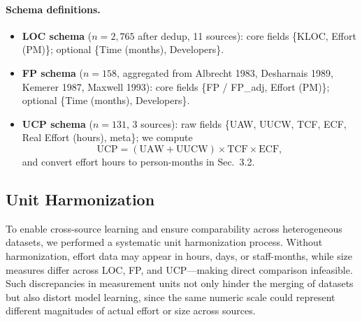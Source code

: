 \documentclass[11pt,a4paper]{article}
\begin{document}
\paragraph{Schema definitions.}
\begin{itemize}[leftmargin=1.2em]
  \item \textbf{LOC schema} ($n = 2{,}765$ after dedup, 11 sources): core fields \{KLOC, Effort (PM)\}; optional \{Time (months), Developers\}.
  \item \textbf{FP schema} ($n=158$, aggregated from Albrecht 1983, Desharnais 1989, Kemerer 1987, Maxwell 1993): core fields \{FP / FP\_adj, Effort (PM)\}; optional \{Time (months), Developers\}.
  \item \textbf{UCP schema} ($n=131$, 3 sources): raw fields \{UAW, UUCW, TCF, ECF, Real Effort (hours), meta\}; we compute
  \[
    \mathrm{UCP} = (\mathrm{UAW} + \mathrm{UUCW}) \times \mathrm{TCF} \times \mathrm{ECF},
  \]
  and convert effort hours to person-months in Sec.~3.2.
\end{itemize}



\graphicspath{{figures/}} %

\subsection{Unit Harmonization}
To enable cross-source learning and ensure comparability across heterogeneous datasets, 
we performed a systematic unit harmonization process. 
Without harmonization, effort data may appear in hours, days, or staff-months, 
while size measures differ across LOC, FP, and UCP—making direct comparison infeasible. 
Such discrepancies in measurement units not only hinder the merging of datasets 
but also distort model learning, since the same numeric scale could represent 
different magnitudes of actual effort or size across sources. 
\end{document}
